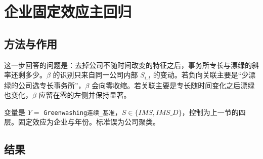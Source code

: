 \documentclass[11pt]{article}
\begin{document}
\section{企业固定效应主回归}
\label{sec:main}

\subsection{方法与作用}

这一步回答的问题是：去掉公司不随时间改变的特征之后，事务所专长与漂绿的斜率还剩多少。\(\beta\) 的识别只来自同一公司内部 \(S_{i,t}\) 的变动。若负向关联主要是``少漂绿的公司选专长事务所''，\(\beta\) 会向零收缩。若关联主要是专长随时间变化之后漂绿也变化，\(\beta\) 应留在零的左侧并保持显著。

变量是 \(Y=\) \texttt{Greenwashing连续\_基准}，\(S\in\{IMS,IMS\_D\}\)，控制为上一节的四层。固定效应为企业与年份。标准误为公司聚类。

\subsection{结果}
\end{document}
